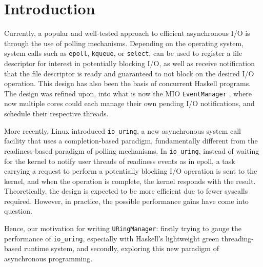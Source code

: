\chapter{Introduction}

Currently, a popular and well-tested approach to efficient asynchronous I/O is through the
use of polling mechanisms. Depending on the operating system, system calls such as \texttt{epoll}, \texttt{kqueue}, or \texttt{select},
can be used to register a file descriptor for interest in potentially blocking I/O,
as well as receive notification that the file descriptor is ready and guaranteed to not
block on the desired I/O operation. This design has also been the basis of concurrent Haskell
programs.
The design was refined upon, into what is now the MIO \texttt{EventManager}
\cite{mio, scalableIO},
where now multiple cores could each manage their own pending I/O notifications, and schedule their respective threads.

More recently, Linux introduced \texttt{io\_uring}, a new asynchronous system call facility that uses a
completion-based paradigm, fundamentally different from the readiness-based paradigm of polling mechanisms.
In \texttt{io\_uring}, instead of waiting for the kernel to notify user threads of readiness events as in epoll,
a task carrying a request to perform a potentially blocking I/O operation is sent to the kernel,
and when the operation is complete, the kernel responds with the result. Theoretically,
the design is expected to be more efficient
due to fewer syscalls required. However, in practice, the possible
performance gains have come into question.

Hence, our motivation for writing \texttt{URingManager}: firstly trying to gauge the performance of \texttt{io\_uring},
especially with Haskell’s lightweight green threading-based runtime system, and secondly,
exploring this new paradigm of asynchronous programming.

